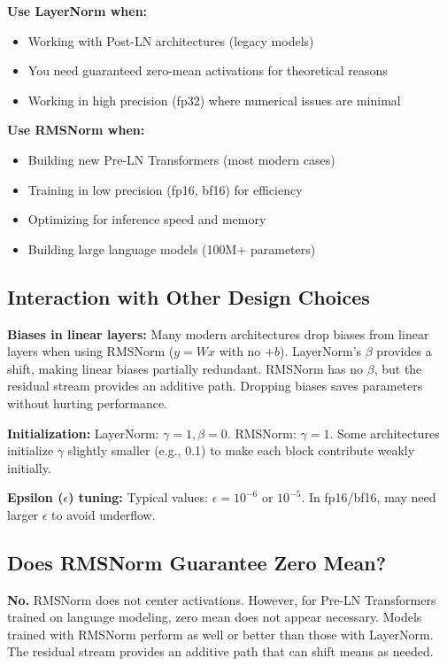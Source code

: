 \documentclass{article}
\begin{document}
\textbf{Use LayerNorm when:}
\begin{itemize}
\item Working with Post-LN architectures (legacy models)
\item You need guaranteed zero-mean activations for theoretical reasons
\item Working in high precision (fp32) where numerical issues are minimal
\end{itemize}

\textbf{Use RMSNorm when:}
\begin{itemize}
\item Building new Pre-LN Transformers (most modern cases)
\item Training in low precision (fp16, bf16) for efficiency
\item Optimizing for inference speed and memory
\item Building large language models (100M+ parameters)
\end{itemize}

\subsection{Interaction with Other Design Choices}

\textbf{Biases in linear layers:} Many modern architectures drop biases from linear layers when using RMSNorm ($y = Wx$ with no $+b$). LayerNorm's $\beta$ provides a shift, making linear biases partially redundant. RMSNorm has no $\beta$, but the residual stream provides an additive path. Dropping biases saves parameters without hurting performance.

\textbf{Initialization:} LayerNorm: $\gamma = 1, \beta = 0$. RMSNorm: $\gamma = 1$. Some architectures initialize $\gamma$ slightly smaller (e.g., 0.1) to make each block contribute weakly initially.

\textbf{Epsilon ($\epsilon$) tuning:} Typical values: $\epsilon = 10^{-6}$ or $10^{-5}$. In fp16/bf16, may need larger $\epsilon$ to avoid underflow.

\subsection{Does RMSNorm Guarantee Zero Mean?}

\textbf{No.} RMSNorm does not center activations. However, for Pre-LN Transformers trained on language modeling, zero mean does not appear necessary. Models trained with RMSNorm perform as well or better than those with LayerNorm. The residual stream provides an additive path that can shift means as needed.
\end{document}
